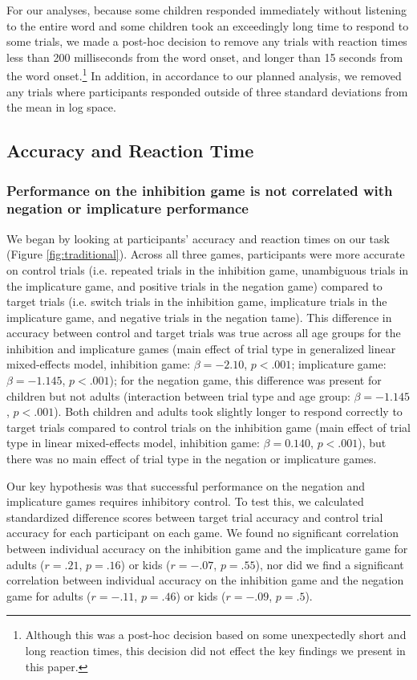 \documentclass[10pt,letterpaper]{article}
\begin{document}
For our analyses, because some children responded immediately without listening to the entire word and some children took an exceedingly long time to respond to some trials, we made a post-hoc decision to remove any trials with reaction times less than 200 milliseconds from the word onset, and longer than 15 seconds from the word onset.\footnote{Although this was a post-hoc decision based on some unexpectedly short and long reaction times, this decision did not effect the key findings we present in this paper.}  In addition, in accordance to our planned analysis, we removed any trials where participants responded outside of three standard deviations from the mean in log space.

\subsection{Accuracy and Reaction Time}

\subsubsection{Performance on the inhibition game is not correlated with negation or implicature performance}

We began by looking at participants' accuracy and reaction times on our task (Figure \ref{fig:traditional}).  Across all three games, participants were more accurate on control trials (i.e. repeated trials in the inhibition game, unambiguous trials in the implicature game, and positive trials in the negation game) compared to target trials (i.e. switch trials in the inhibition game, implicature trials in the implicature game, and negative trials in the negation tame).  This difference in accuracy between control and target trials was true across all age groups for the inhibition and implicature games (main effect of trial type in generalized linear mixed-effects model, inhibition game: $\beta = -2.10$, $p< .001$; implicature game: $\beta = -1.145$, $p< .001$); for the negation game, this difference was present for children but not adults (interaction between trial type and age group: $\beta = -1.145$, $p< .001$).  Both children and adults took slightly longer to respond correctly to target trials compared to control trials on the inhibition game (main effect of trial type in linear mixed-effects model, inhibition game: $\beta = 0.140$, $p< .001$), but there was no main effect of trial type in the negation or implicature games.  

Our key hypothesis was that successful performance on the negation and implicature games requires inhibitory control.  To test this, we calculated standardized difference scores between target trial accuracy and control trial accuracy for each participant on each game.  We found no significant correlation between individual accuracy on the inhibition game and the implicature game for adults ($r = .21$, $p = .16$) or kids  ($r = -.07$, $p = .55$), nor did we find a significant correlation between individual accuracy on the inhibition game and the negation game for adults  ($r = -.11$, $p = .46$) or kids  ($r = -.09$, $p = .5$).  
\end{document}
